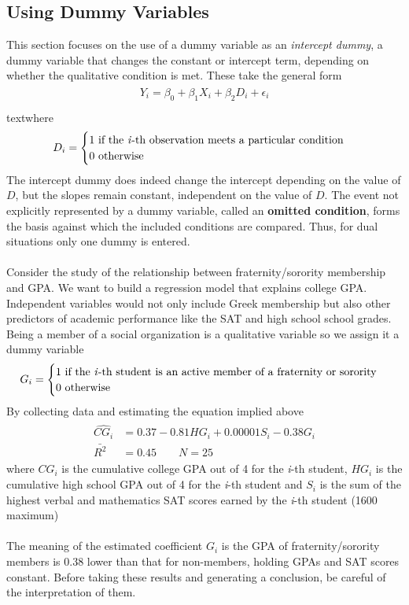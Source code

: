 \documentclass[11pt]{article}
\begin{document}
\subsection{Using Dummy Variables}
This section focuses on the use of a dummy variable as an \textit{intercept dummy}, a dummy variable that changes the constant or intercept term, depending on whether the qualitative condition is met. These take the general form 
\begin{align}\label{eg7_20}
\begin{split}
Y_i = \beta_0 + \beta_1X_i + \beta_2D_i + \epsilon_i \\
\end{split}
\end{align}
text{where}
$$
D_i = \begin{cases}
{1 \text{ if the \textit{i}-th observation meets a particular condition}}\\{0 \text{ otherwise}}
\end{cases}
$$
The intercept dummy does indeed change the intercept depending on the value of $D$, but the slopes remain constant, independent on the value of $D$. The event not explicitly represented by a dummy variable, called an \textbf{omitted condition}, forms the basis against which the included conditions are compared. Thus, for dual situations only one dummy is entered. \\ \\
Consider the study of the relationship between fraternity/sorority membership and GPA. We want to build a regression model that explains college GPA. Independent variables would not only include Greek membership but also other predictors of academic performance like the SAT and high school school grades. Being a member of a social organization is a qualitative variable so we assign it a dummy variable
$$
G_i = \begin{cases}
1 \text { if the \textit{i}-th student is an active member of a fraternity or sorority}\\
0 \text{ otherwise}
\end{cases}
$$
By collecting data and estimating the equation implied above
\begin{align}
\label{eg7_21}
\begin{split}
\widehat{CG_i} &= 0.37 - {0.81HG_i} + {0.00001S_i} - {0.38G_i}\\
\bar{R^2}&= 0.45 \quad\quad N=25
\end{split}
\end{align}
where  $CG_i$ is the cumulative college GPA out of 4 for the \textit{i}-th student, $HG_i$ is the cumulative high school GPA out of 4 for the \textit{i}-th student and $S_i$ is the sum of the highest verbal and mathematics SAT scores earned by the \textit{i}-th student (1600 maximum)\\ \\
The meaning of the estimated coefficient $G_i$ is the GPA of fraternity/sorority members is 0.38 lower than that for non-members, holding GPAs and SAT scores constant. Before taking these results and generating a conclusion, be careful of the interpretation of them.
\end{document}
